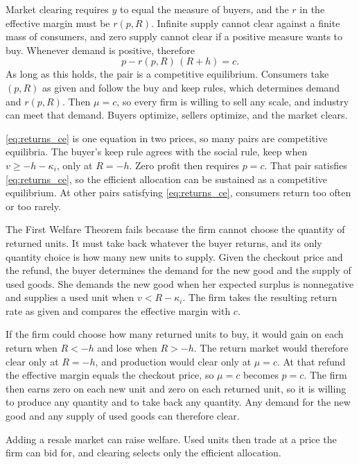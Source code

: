 \documentclass[11pt]{article}
\begin{document}
Market clearing requires $y$ to equal the measure of buyers, and the $r$ in
the effective margin must be $r(p,R)$. Infinite supply cannot clear against
a finite mass of consumers, and zero supply cannot clear if a positive
measure wants to buy. Whenever demand is positive, therefore
\begin{equation}
  \label{eq:returns_ce}
  p-r(p,R)\,(R+h)=c.
\end{equation}
As long as this holds, the pair is a competitive equilibrium. Consumers take
$(p,R)$ as given and follow the buy and keep rules, which determines demand
and $r(p,R)$. Then $\mu=c$, so every firm is willing to sell any scale, and
industry can meet that demand. Buyers optimize, sellers optimize, and the
market clears.

\eqref{eq:returns_ce} is one equation in two prices, so many pairs are
competitive equilibria. The buyer's keep rule agrees with the social rule,
keep when $v\geq -h-\kappa_i$, only at $R=-h$. Zero profit then requires
$p=c$. That pair satisfies \eqref{eq:returns_ce}, so the efficient
allocation can be sustained as a competitive equilibrium. At other pairs
satisfying \eqref{eq:returns_ce}, consumers return too often or too rarely.

The First Welfare Theorem fails because the firm cannot choose the quantity
of returned units. It must take back whatever the buyer returns, and its
only quantity choice is how many new units to supply. Given the checkout
price and the refund, the buyer determines the demand for the new good and
the supply of used goods. She demands the new good when her expected surplus
is nonnegative and supplies a used unit when $v<R-\kappa_i$. The firm takes
the resulting return rate as given and compares the effective margin with
$c$.

If the firm could choose how many returned units to buy, it would gain on
each return when $R<-h$ and lose when $R>-h$. The return market would
therefore clear only at $R=-h$, and production would clear only at $\mu=c$.
At that refund the effective margin equals the checkout price, so $\mu=c$
becomes $p=c$. The firm then earns zero on each new unit and zero on each
returned unit, so it is willing to produce any quantity and to take back any
quantity. Any demand for the new good and any supply of used goods can
therefore clear.

Adding a resale market can raise welfare. Used units then trade at a price
the firm can bid for, and clearing selects only the efficient allocation.
\end{document}
